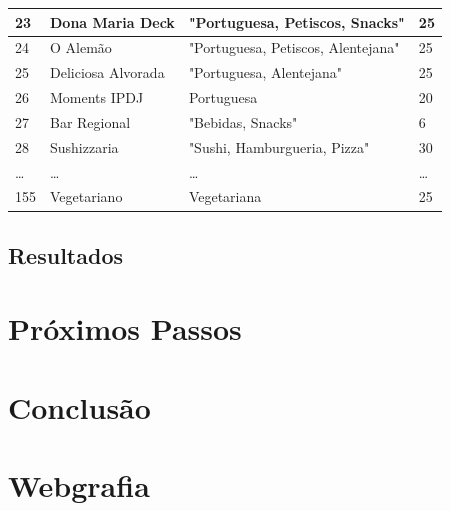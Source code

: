 \documentclass[a4paper,10pt]{article}
\begin{document}
\begin{table}[!ht]
\begin{tabular}{|l|l|l|l|}
      23 & Dona Maria Deck & "Portuguesa, Petiscos, Snacks" & 25 \\ \hline
      24 & O Alemão & "Portuguesa, Petiscos, Alentejana" & 25 \\ \hline
      25 & Deliciosa Alvorada & "Portuguesa, Alentejana" & 25 \\ \hline
      26 & Moments IPDJ & Portuguesa & 20 \\ \hline
      27 & Bar Regional & "Bebidas, Snacks" & 6 \\ \hline
      28 & Sushizzaria & "Sushi, Hamburgueria, Pizza" & 30 \\ \hline
      \ldots & \ldots & \ldots & \ldots \\ \hline
      155 & Vegetariano & Vegetariana & 25 \\ \hline
  \end{tabular}
\end{table}

\newpage

\subsection{Resultados}

\newpage

\section{Próximos Passos}

\newpage

\section{Conclusão}

\newpage

\section{Webgrafia}
\renewcommand{\bibsection}{}

\end{document}
